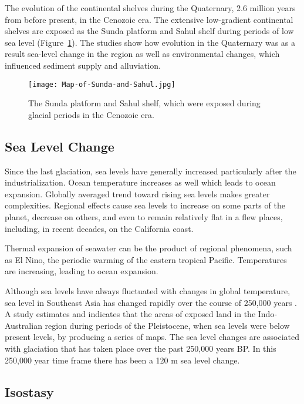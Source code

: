 The evolution of the continental shelves during the Quaternary, 2.6 million years from before present, in the Cenozoic era. The extensive low-gradient continental shelves are exposed as the Sunda platform and Sahul shelf during periods of low sea level (Figure~\ref{fig:sunda}). The studies show how evolution in the Quaternary was as a result sea-level change in the region as well as environmental changes, which influenced sediment supply and alluviation. 

\begin{figure}
\centering
\texttt{[image: Map-of-Sunda-and-Sahul.jpg]}
 \caption{The Sunda platform and Sahul shelf, which were exposed during glacial periods in the Cenozoic era.}
\label{fig:sunda}
\end{figure}

\subsection{Sea Level Change}

Since the last glaciation, sea levels have generally increased particularly after the industrialization. Ocean temperature increases as well which leads to ocean expansion. Globally averaged trend toward rising sea levels makes greater complexities. Regional effects cause sea levels to increase on some parts of the planet, decrease on others, and even to remain relatively flat in a flew places, including, in recent decades, on the California coast.

Thermal expansion of seawater can be the product of regional phenomena, such as El Nino, the periodic warming of the eastern tropical Pacific. Temperatures are increasing, leading to ocean expansion.
  
Although sea levels have always fluctuated with changes in global temperature, sea level in Southeast Asia has changed rapidly over the course of  250,000 years \citep{voris2000maps}. A study estimates and indicates that  the areas of exposed land in the Indo-Australian region during periods of the Pleistocene, when sea levels were below present levels, by producing a series of maps. The sea level changes are associated with glaciation that has taken place over the past 250,000 years BP. In this 250,000 year time frame there has been a 120 m sea level change.


\subsection{Isostasy}

